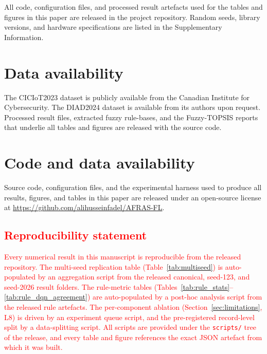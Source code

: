 \documentclass[journal]{IEEEtran}
\newcommand{\rev}[1]{\textcolor{red}{#1}}
\begin{document}
All code, configuration files, and processed result artefacts
used for the tables and figures in this paper are released in the
project repository. Random seeds, library versions, and hardware
specifications are listed in the Supplementary Information.






\section*{Data availability}
The CICIoT2023 dataset is publicly available from the Canadian Institute
for Cybersecurity\cite{ciciot2023}. The DIAD2024 dataset is available
from its authors upon request\cite{diad2024}. Processed result files,
extracted fuzzy rule-bases, and the Fuzzy-TOPSIS reports that underlie
all tables and figures are released with the source code.

\section*{Code and data availability}
Source code, configuration files, and the experimental harness used to
produce all results, figures, and tables in this paper are released
under an open-source license at \url{https://github.com/alihusseinfadel/AFRAS-FL}.

\rev{\section*{Reproducibility statement}
Every numerical result in this manuscript is reproducible from the released
repository. The multi-seed replication table
(Table~\ref{tab:multiseed}) is auto-populated by an aggregation script
from the released canonical, seed-123, and seed-2026 result folders. The
rule-metric tables (Tables~\ref{tab:rule_stats}--\ref{tab:rule_dqn_agreement})
are auto-populated by a post-hoc analysis script from the released rule
artefacts. The per-component ablation (Section~\ref{sec:limitations}, L8)
is driven by an experiment queue script, and the pre-registered
record-level split by a data-splitting script. All scripts are provided
under the \texttt{scripts/} tree of the release, and every table and
figure references the exact JSON artefact from which it was built.}
\end{document}
